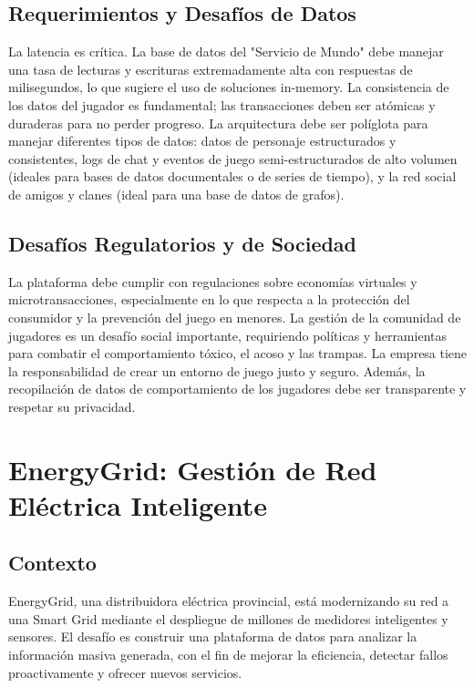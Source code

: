 \documentclass[12pt]{article}
\begin{document}
\subsection{Requerimientos y Desafíos de Datos}
La latencia es crítica. La base de datos del "Servicio de Mundo" debe manejar una tasa de lecturas y escrituras extremadamente alta con respuestas de milisegundos, lo que sugiere el uso de soluciones in-memory. La consistencia de los datos del jugador es fundamental; las transacciones deben ser atómicas y duraderas para no perder progreso. La arquitectura debe ser políglota para manejar diferentes tipos de datos: datos de personaje estructurados y consistentes, logs de chat y eventos de juego semi-estructurados de alto volumen (ideales para bases de datos documentales o de series de tiempo), y la red social de amigos y clanes (ideal para una base de datos de grafos).

\subsection{Desafíos Regulatorios y de Sociedad}
La plataforma debe cumplir con regulaciones sobre economías virtuales y microtransacciones, especialmente en lo que respecta a la protección del consumidor y la prevención del juego en menores. La gestión de la comunidad de jugadores es un desafío social importante, requiriendo políticas y herramientas para combatir el comportamiento tóxico, el acoso y las trampas. La empresa tiene la responsabilidad de crear un entorno de juego justo y seguro. Además, la recopilación de datos de comportamiento de los jugadores debe ser transparente y respetar su privacidad.

\newpage

\section{EnergyGrid: Gestión de Red Eléctrica Inteligente}

\subsection{Contexto}
EnergyGrid, una distribuidora eléctrica provincial, está modernizando su red a una Smart Grid mediante el despliegue de millones de medidores inteligentes y sensores. El desafío es construir una plataforma de datos para analizar la información masiva generada, con el fin de mejorar la eficiencia, detectar fallos proactivamente y ofrecer nuevos servicios.
\end{document}
